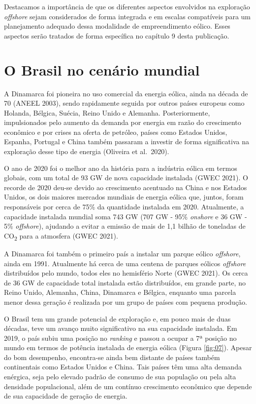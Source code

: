 \documentclass[
  oneside]{scrbook}
\begin{document}
Destacamos a importância de que os diferentes aspectos envolvidos na exploração \emph{offshore} sejam considerados de forma integrada e em escalas compatíveis para um planejamento adequado dessa modalidade de empreendimento eólico. Esses aspectos serão tratados de forma específica no capítulo 9 desta publicação.

\hypertarget{o-brasil-no-cenuxe1rio-mundial}{%
\section{O Brasil no cenário mundial}\label{o-brasil-no-cenuxe1rio-mundial}}

A Dinamarca foi pioneira no uso comercial da energia eólica, ainda na década de 70 (ANEEL 2003), sendo rapidamente seguida por outros países europeus como Holanda, Bélgica, Suécia, Reino Unido e Alemanha. Posteriormente, impulsionados pelo aumento da demanda por energia em razão do crescimento econômico e por crises na oferta de petróleo, países como Estados Unidos, Espanha, Portugal e China também passaram a investir de forma significativa na exploração desse tipo de energia (Oliveira et al.~2020).

O ano de 2020 foi o melhor ano da história para a indústria eólica em termos globais, com um total de 93 GW de nova capacidade instalada (GWEC 2021). O recorde de 2020 deu-se devido ao crescimento acentuado na China e nos Estados Unidos, os dois maiores mercados mundiais de energia eólica que, juntos, foram responsáveis por cerca de 75\% da quantidade instalada em 2020. Atualmente, a capacidade instalada mundial soma 743 GW (707 GW - 95\% \emph{onshore} e 36 GW - 5\% \emph{offshore}), ajudando a evitar a emissão de mais de 1,1 bilhão de toneladas de CO\textsubscript{2} para a atmosfera (GWEC 2021).

A Dinamarca foi também o primeiro país a instalar um parque eólico \emph{offshore}, ainda em 1991. Atualmente há cerca de uma centena de parques eólicos \emph{offshore} distribuídos pelo mundo, todos eles no hemisfério Norte (GWEC 2021). Os cerca de 36 GW de capacidade total instalada estão distribuídos, em grande parte, no Reino Unido, Alemanha, China, Dinamarca e Bélgica, enquanto uma parcela menor dessa geração é realizada por um grupo de países com pequena produção.

O Brasil tem um grande potencial de exploração e, em pouco mais de duas décadas, teve um avanço muito significativo na sua capacidade instalada. Em 2019, o país subiu uma posição no \emph{ranking} e passou a ocupar a 7ª posição no mundo em termos de potência instalada de energia eólica (Figura \ref{fig:07}). Apesar do bom desempenho, encontra-se ainda bem distante de países também continentais como Estados Unidos e China. Tais países têm uma alta demanda enérgica, seja pelo elevado padrão de consumo de sua população ou pela alta densidade populacional, além de um contínuo crescimento econômico que depende de sua capacidade de geração de energia.
\end{document}
